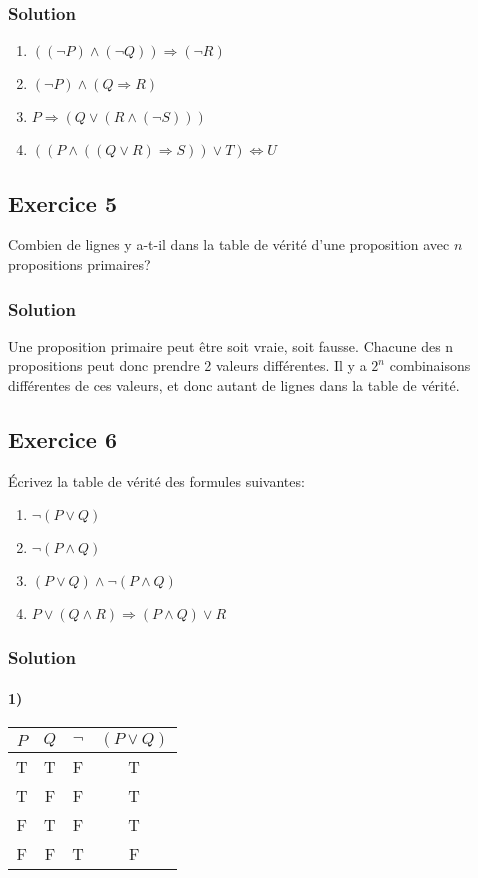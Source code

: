 \subsubsection*{Solution}
    \begin{enumerate}
        \item $((\neg P) \land (\neg Q)) \Rightarrow (\neg R)$
        \item $(\neg P) \land (Q \Rightarrow R)$
        \item $P \Rightarrow (Q \lor (R \land (\neg S)))$
        \item $((P \land ((Q \lor R) \Rightarrow S)) \lor T) \Leftrightarrow U$
    \end{enumerate}


\subsection*{Exercice 5}
Combien de lignes y a-t-il dans la table de vérité d'une proposition avec
$n$ propositions primaires?


\subsubsection*{Solution}

    Une proposition primaire peut être soit vraie, soit fausse.
    Chacune des n propositions peut donc prendre 2 valeurs différentes.
    Il y a $2^n$ combinaisons différentes de ces valeurs, et donc autant de lignes dans la table de vérité.

\subsection*{Exercice 6}
Écrivez la table de vérité des formules suivantes:
\begin{enumerate}
	\item $\neg (P \lor Q)$
	\item $\neg (P \land Q)$
	\item $(P \lor Q) \land \neg(P \land Q)$
	\item $P \lor (Q \land R) \Rightarrow (P \land Q) \lor R$
\end{enumerate}


\subsubsection*{Solution}

    \paragraph{1)}
    \begin{center}
    	\begin{tabular}{cc|cc}
    		$P$ & $Q$ & $\neg$ & $(P \lor Q)$ \\
    		\hline
    		T & T & \color{red}F & T\\
    		T & F & \color{red}F & T\\
    		F & T & \color{red}F & T\\
    		F & F & \color{red}T & F\\
    	\end{tabular}
    \end{center}
    
